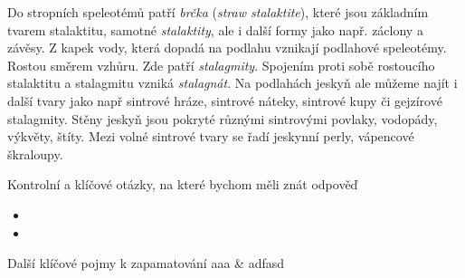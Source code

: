 Do stropních speleotémů patří \emph{brčka} (\textit{straw stalaktite}), které jsou základním tvarem stalaktitu, samotné \emph{stalaktity}, ale i další formy jako např. záclony a závěsy. Z kapek vody, která dopadá na podlahu vznikají podlahové speleotémy. Rostou směrem vzhůru. Zde patří \emph{stalagmity}. Spojením proti sobě rostoucího stalaktitu a stalagmitu vzniká \emph{stalagnát}. Na podlahách jeskyň ale můžeme najít i další tvary jako např sintrové hráze, sintrové náteky, sintrové kupy či gejzírové stalagmity. Stěny jeskyň jsou pokryté různými sintrovými povlaky, vodopády, výkvěty, štíty. Mezi volné sintrové tvary se řadí jeskynní perly, vápencové škraloupy.


\newpage
\onecolumn
\begin{boxotazky}{Kontrolní a klíčové otázky, na které bychom měli znát odpověď}
	\begin{itemize}
		\item 
		\item 
		
	\end{itemize}
\end{boxotazky}

\begin{boxslovnik}{Další klíčové pojmy k zapamatování}
	aaa & adfasd \\
	
\end{boxslovnik}
\twocolumn